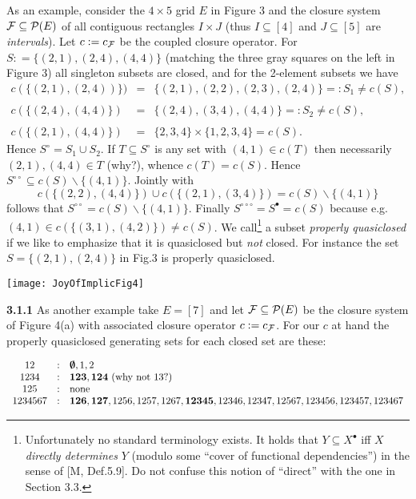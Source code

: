 \documentclass[11pt]{article}
\newcommand{\bempt}{\hbox{\boldmath$\emptyset$}}
\begin{document}
As an example, consider the $4 \times 5$ grid $E$ in Figure 3 and the closure system ${\cal F} \subseteq {\cal P}(E)$ of all contiguous rectangles $I \times J$ (thus $I \subseteq [4]$ and $J \subseteq [5]$ are {\it intervals}). Let $c: = c_{\cal F}$ be the coupled closure operator. For $S: = \{(2,1), (2,4), (4,4)\}$ (matching the three gray squares on the left in Figure 3) all singleton subsets are closed, and for the 2-element subsets we have
$$\begin{array}{lll}
c(\{(2,1), (2,4))\}) & =& \{(2,1), (2,2),(2,3), (2,4)\} = : S_1 \neq c(S),\\
\\
c(\{(2,4), (4,4)\}) &= & \{(2,4), (3,4), (4,4) \} = : S_2 \neq c(S),\\
\\
c(\{(2,1), (4,4)\}) & =& \{2,3,4\} \times \{1,2,3,4\} = c(S). \end{array}$$
Hence $S^\circ = S_1 \cup S_2$. If $T \subseteq S^\circ$ is any set with $(4,1) \in c(T)$ then necessarily $(2,1), (4,4) \in T$ (why?), whence $c(T) = c(S)$. Hence $S^{\circ \circ} \subseteq c(S) \backslash \{(4,1)\}$. Jointly with 
$$c(\{(2,2), (4,4)\}) \cup c(\{(2,1), (3,4)\}) = c(S) \backslash \{(4,1)\}$$
follows that $S^{\circ \circ} =c(S) \backslash \{(4,1)\}$. Finally $S^{\circ \circ \circ} = S^\bullet = c(S)$ because e.g. $(4,1) \in c(\{(3,1), (4,2)\}) \neq c(S)$.
We call\footnote{Unfortunately no standard terminology exists. It holds that $Y \subseteq X^\bullet$ iff $X$ {\it directly determines} $Y$ (modulo some ``cover of functional dependencies'') in the sense of [M, Def.5.9]. Do not confuse this notion of ``direct'' with the one in Section 3.3.} a subset {\it properly quasiclosed} if we like to emphasize that it is quasiclosed but {\it not} closed.
For instance the set $S = \{(2,1), (2,4)\}$ in Fig.3 is properly quasiclosed. 


\texttt{[image: JoyOfImplicFig4]}


{\bf 3.1.1} As another example take $E = [7]$ and let ${\cal F} \subseteq {\cal P}(E)$ be the closure system of Figure 4(a) with associated closure operator $c: = c_{\cal F}$. For our $c$ at hand the properly quasiclosed generating sets for each closed set are these:

$\begin{array}{cll}
12 & : & \bempt, 1,2\\
1234 & : & {\bf 123}, {\bf 124} \ (\mbox{why not 13?})\\
125 & : & \mbox{none}\\
1234567 & : & {\bf 126}, {\bf 127}, 1256, 1257, 1267, {\bf 12345}, 12346, 12347,
12567, 123456, 123457, 123467
\end{array}$
\end{document}
